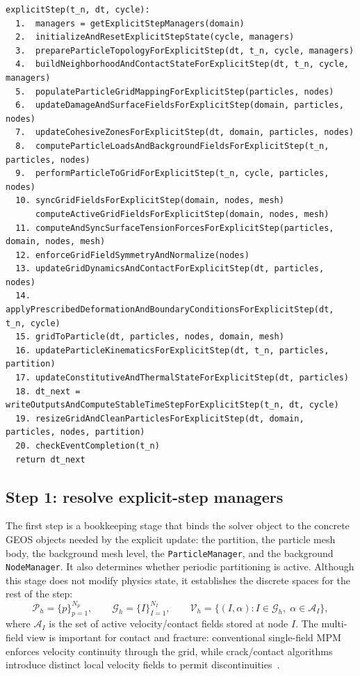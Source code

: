 \begin{lstlisting}[caption={High-level explicit GEOS-MPM solver step.},label={alg:explicit-step},basicstyle=\ttfamily\small]
explicitStep(t_n, dt, cycle):
  1.  managers = getExplicitStepManagers(domain)
  2.  initializeAndResetExplicitStepState(cycle, managers)
  3.  prepareParticleTopologyForExplicitStep(dt, t_n, cycle, managers)
  4.  buildNeighborhoodAndContactStateForExplicitStep(dt, t_n, cycle, managers)
  5.  populateParticleGridMappingForExplicitStep(particles, nodes)
  6.  updateDamageAndSurfaceFieldsForExplicitStep(domain, particles, nodes)
  7.  updateCohesiveZonesForExplicitStep(dt, domain, particles, nodes)
  8.  computeParticleLoadsAndBackgroundFieldsForExplicitStep(t_n, particles, nodes)
  9.  performParticleToGridForExplicitStep(t_n, cycle, particles, nodes)
  10. syncGridFieldsForExplicitStep(domain, nodes, mesh)
      computeActiveGridFieldsForExplicitStep(domain, nodes, mesh)
  11. computeAndSyncSurfaceTensionForcesForExplicitStep(particles, domain, nodes, mesh)
  12. enforceGridFieldSymmetryAndNormalize(nodes)
  13. updateGridDynamicsAndContactForExplicitStep(dt, particles, nodes)
  14. applyPrescribedDeformationAndBoundaryConditionsForExplicitStep(dt, t_n, cycle)
  15. gridToParticle(dt, particles, nodes, domain, mesh)
  16. updateParticleKinematicsForExplicitStep(dt, t_n, particles, partition)
  17. updateConstitutiveAndThermalStateForExplicitStep(dt, particles)
  18. dt_next = writeOutputsAndComputeStableTimeStepForExplicitStep(t_n, dt, cycle)
  19. resizeGridAndCleanParticlesForExplicitStep(dt, domain, particles, nodes, partition)
  20. checkEventCompletion(t_n)
  return dt_next
\end{lstlisting}

\subsection{Step 1: resolve explicit-step managers}
\label{subsec:solver-step-1}
The first step is a bookkeeping stage that binds the solver object to the concrete GEOS objects needed by the explicit update: the partition, the particle mesh body, the background mesh level, the \texttt{ParticleManager}, and the background \texttt{NodeManager}.  It also determines whether periodic partitioning is active.  Although this stage does not modify physics state, it establishes the discrete spaces for the rest of the step:
\begin{equation}
  \mathcal{P}_h = \{p\}_{p=1}^{N_p}, \qquad
  \mathcal{G}_h = \{I\}_{I=1}^{N_I}, \qquad
  \mathcal{V}_h = \{(I,\alpha): I\in\mathcal{G}_h,\; \alpha\in\mathcal{A}_I\},
\end{equation}
where $\mathcal{A}_I$ is the set of active velocity/contact fields stored at node $I$.  The multi-field view is important for contact and fracture: conventional single-field MPM enforces velocity continuity through the grid, while crack/contact algorithms introduce distinct local velocity fields to permit discontinuities~\cite{nairn2003cramp,homel2016dfg}.

